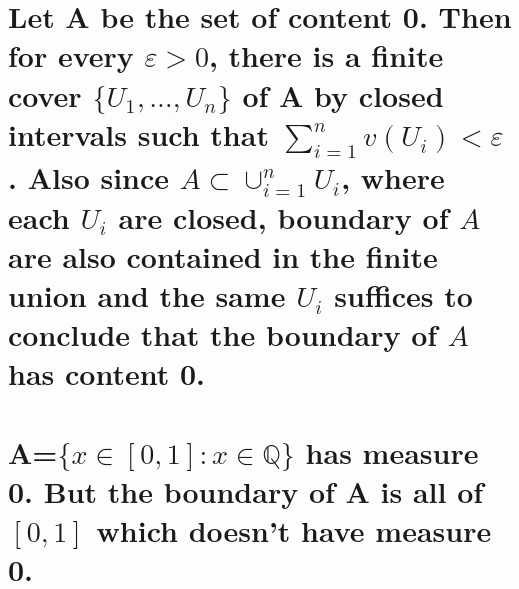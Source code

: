 \begin{solution}
    \begin{parts}
        \part{
            Let A be the set of content 0.
    Then for every $\varepsilon>0$,
    there is a finite cover
    $\{U_1,\ldots,U_n\}$ of A by
    closed intervals such that
    $\sum_{i=1}^n{v(U_i)}<\varepsilon$.
    Also since $A\subset\cup_{i=1}^n{U_i}$,
    where each $U_i$ are closed, boundary
    of $A$ are also contained in the finite
    union and the same $U_i$ suffices to
    conclude that the boundary of $A$ has
    content 0.
        }

        \part{
        A=$\{x\in[0,1]:x\in\mathbb{Q}\}$
        has measure 0. But the
        boundary of A is all of $[0,1]$
        which doesn't have measure 0.
        }
    \end{parts}
\end{solution}